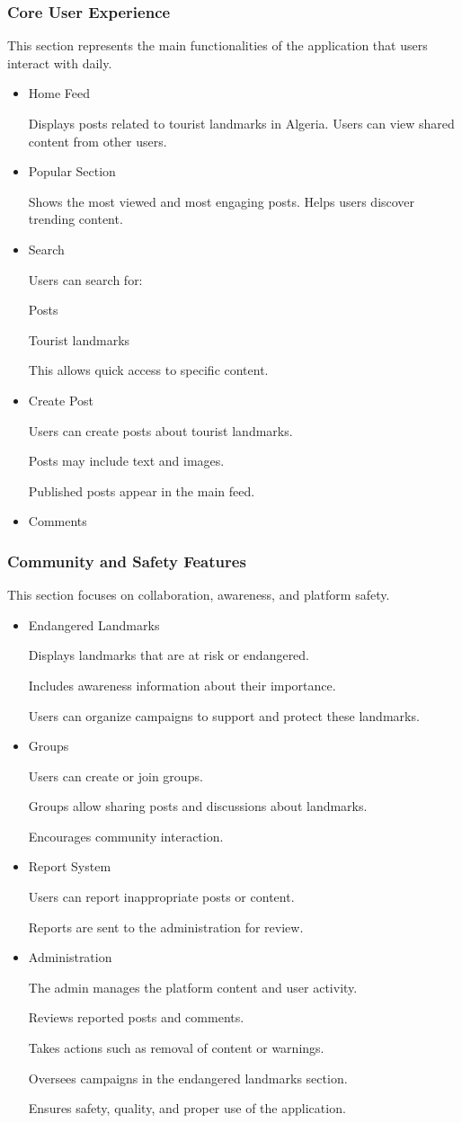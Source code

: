\documentclass[12pt]{article}
\begin{document}
\subsubsection{Core User Experience}
This section represents the main functionalities of the application that users interact with daily.
\begin{itemize}
    \item Home Feed
    
Displays posts related to tourist landmarks in Algeria.
Users can view shared content from other users.
    \item Popular Section

    Shows the most viewed and most engaging posts.
Helps users discover trending content.
    \item Search

    Users can search for:
    
Posts

Tourist landmarks

This allows quick access to specific content.
    \item  Create Post

Users can create posts about tourist landmarks.

Posts may include text and images.

Published posts appear in the main feed.
     \item Comments
\end{itemize}
\subsubsection{Community and Safety Features}
This section focuses on collaboration, awareness, and platform safety.
\begin{itemize}
    \item Endangered Landmarks
    
Displays landmarks that are at risk or endangered.

Includes awareness information about their importance.

Users can organize campaigns to support and protect these landmarks.
    \item  Groups
    
Users can create or join groups.

Groups allow sharing posts and discussions about landmarks.

Encourages community interaction.
    \item Report System
    
Users can report inappropriate posts or content.

Reports are sent to the administration for review.
     \item Administration
     
The admin manages the platform content and user activity.

Reviews reported posts and comments.

Takes actions such as removal of content or warnings.

Oversees campaigns in the endangered landmarks section.

Ensures safety, quality, and proper use of the application.
\end{itemize}
\end{document}
